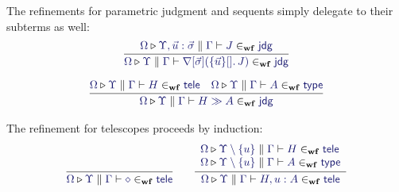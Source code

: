 \documentclass[11pt]{article}
\theoremstyle{definition}
\theoremstyle{remark}
\numberwithin{equation}{section}
\def\IModeColorName{MidnightBlue}
\newcommand\IMode[1]{{\color{\IModeColorName}{#1}}}
\newcommand\MkSet[1]{\left\{#1\right\}}
\newcommand\MkBTm[3]{\{#1\}[#2].\, #3}
\newcommand\IsWf[5]{%
  \IMode{#1}\triangleright%
  \IMode{#2}\parallel%
  \IMode{#3}\vdash%
  \IMode{#4}\in_{\mathbf{wf}}\IMode{#5}%
}
\newcommand\App[2]{#1(#2)}
\begin{document}
The refinements for parametric judgment and sequents simply delegate to their
subterms as well:
\begin{gather*}
  \infer{
    \IsWf{\Omega}{\Upsilon}{\Gamma}{
      \App{\OpNabla{\vec{\sigma}}}{
        \MkBTm{\vec{u}}{}{J}
      }
    }{\SortJdg}
  }{
    \IsWf{\Omega}{\Upsilon,\vec{u}:\vec{\sigma}}{\Gamma}{J}{\SortJdg}
  }\\[6pt]
  \infer{
    \IsWf{\Omega}{\Upsilon}{\Gamma}{
      H\gg A
    }{\SortJdg}
  }{
    \IsWf{\Omega}{\Upsilon}{\Gamma}{H}{\SortTele} &
    \IsWf{\Omega}{\Upsilon}{\Gamma}{A}{\SortType}
  }
\end{gather*}

The refinement for telescopes proceeds by induction:
\begin{gather*}
  \infer{
    \IsWf{\Omega}{\Upsilon}{\Gamma}{\diamond}{\SortTele}
  }{
  }
  \qquad
  \infer{
    \IsWf{\Omega}{\Upsilon}{\Gamma}{H,u:A}{\SortTele}
  }{
    \begin{array}{l}
      \IsWf{\Omega}{\Upsilon\setminus\MkSet{u}}{\Gamma}{H}{\SortTele}\\
      \IsWf{\Omega}{\Upsilon\setminus\MkSet{u}}{\Gamma}{A}{\SortType}
    \end{array}
  }
\end{gather*}

\ifdraft{}{
  \nocite{*}
  
  
}
\end{document}
